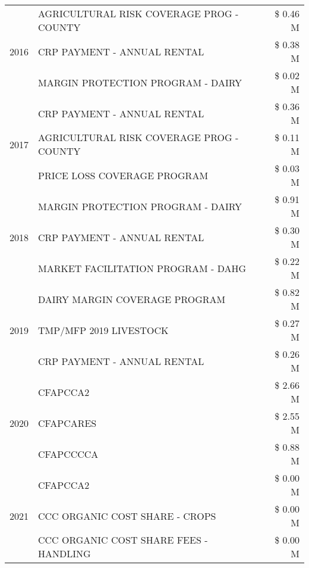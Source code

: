 \begin{tabular}{llr}
\cline{1-3}
\multirow[t]{3}{*}{2016} & AGRICULTURAL RISK COVERAGE PROG - COUNTY & \$ 0.46 M \\
 & CRP PAYMENT - ANNUAL RENTAL & \$ 0.38 M \\
 & MARGIN PROTECTION PROGRAM - DAIRY & \$ 0.02 M \\
\cline{1-3}
\multirow[t]{3}{*}{2017} & CRP PAYMENT - ANNUAL RENTAL & \$ 0.36 M \\
 & AGRICULTURAL RISK COVERAGE PROG - COUNTY & \$ 0.11 M \\
 & PRICE LOSS COVERAGE PROGRAM & \$ 0.03 M \\
\cline{1-3}
\multirow[t]{3}{*}{2018} & MARGIN PROTECTION PROGRAM - DAIRY & \$ 0.91 M \\
 & CRP PAYMENT - ANNUAL RENTAL & \$ 0.30 M \\
 & MARKET FACILITATION PROGRAM - DAHG & \$ 0.22 M \\
\cline{1-3}
\multirow[t]{3}{*}{2019} & DAIRY MARGIN COVERAGE PROGRAM & \$ 0.82 M \\
 & TMP/MFP 2019 LIVESTOCK & \$ 0.27 M \\
 & CRP PAYMENT - ANNUAL RENTAL & \$ 0.26 M \\
\cline{1-3}
\multirow[t]{3}{*}{2020} & CFAPCCA2 & \$ 2.66 M \\
 & CFAPCARES & \$ 2.55 M \\
 & CFAPCCCCA & \$ 0.88 M \\
\cline{1-3}
\multirow[t]{3}{*}{2021} & CFAPCCA2 & \$ 0.00 M \\
 & CCC ORGANIC COST SHARE - CROPS & \$ 0.00 M \\
 & CCC ORGANIC COST SHARE FEES - HANDLING & \$ 0.00 M \\
\cline{1-3}
\bottomrule
\end{tabular}
